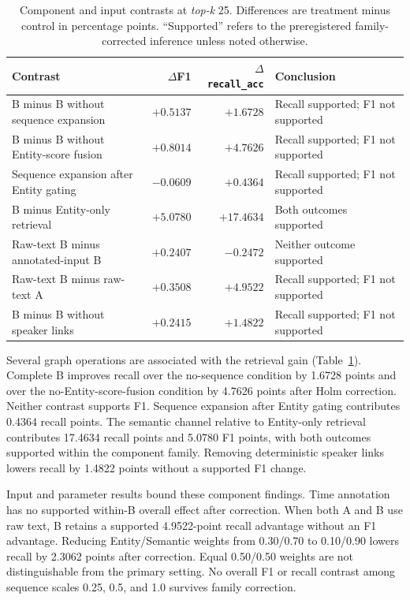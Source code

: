 \documentclass[10pt,twocolumn]{article}
\newcommand{\recallacc}{\texttt{recall\_acc}}
\newcommand{\topk}{\textit{top-k}}
\begin{document}
\begin{table}[t]
\centering
\caption{Component and input contrasts at \topk{} 25. Differences are
treatment minus control in percentage points. ``Supported'' refers to the
preregistered family-corrected inference unless noted otherwise.}
\label{tab:components}
\begin{tabularx}{\textwidth}{@{}Xrrl@{}}
\toprule
Contrast & \(\Delta\)F1 & \(\Delta\)\recallacc{} & Conclusion \\
\midrule
B minus B without sequence expansion & \(+0.5137\) & \(+1.6728\) & Recall supported; F1 not supported \\
B minus B without Entity-score fusion & \(+0.8014\) & \(+4.7626\) & Recall supported; F1 not supported \\
Sequence expansion after Entity gating & \(-0.0609\) & \(+0.4364\) & Recall supported; F1 not supported \\
B minus Entity-only retrieval & \(+5.0780\) & \(+17.4634\) & Both outcomes supported \\
Raw-text B minus annotated-input B & \(+0.2407\) & \(-0.2472\) & Neither outcome supported \\
Raw-text B minus raw-text A & \(+0.3508\) & \(+4.9522\) & Recall supported; F1 not supported \\
B minus B without speaker links & \(+0.2415\) & \(+1.4822\) & Recall supported; F1 not supported \\
\bottomrule
\end{tabularx}
\end{table}

Several graph operations are associated with the retrieval gain
(Table~\ref{tab:components}). Complete B improves recall over the no-sequence
condition by 1.6728 points and over the no-Entity-score-fusion condition by
4.7626 points after Holm correction. Neither contrast supports F1. Sequence
expansion after Entity gating contributes 0.4364 recall points. The semantic
channel relative to Entity-only retrieval contributes 17.4634 recall points
and 5.0780 F1 points, with both outcomes supported within the component
family. Removing deterministic speaker links lowers recall by 1.4822 points
without a supported F1 change.

Input and parameter results bound these component findings. Time annotation
has no supported within-B overall effect after correction. When both A and B
use raw text, B retains a supported 4.9522-point recall advantage without an
F1 advantage. Reducing Entity/Semantic weights from 0.30/0.70 to 0.10/0.90
lowers recall by 2.3062 points after correction. Equal 0.50/0.50 weights are
not distinguishable from the primary setting. No overall F1 or recall
contrast among sequence scales 0.25, 0.5, and 1.0 survives family correction.
\end{document}
